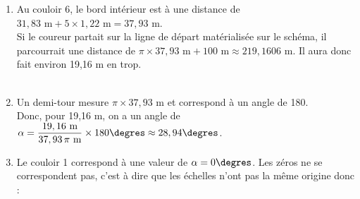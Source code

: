 \begin{enumerate}
\begin{enumerate}
      \item Au couloir 6, le bord intérieur est à une distance de $31,83\text{ m}+5\times1,22\text{ m} =37,93\text{ m}$. \\
      Si le coureur partait sur la ligne de départ matérialisée sur le schéma, il parcourrait une distance de $\pi\times37,93\text{ m}+100\text{ m} \approx219,1606\text{ m}$. Il aura donc fait environ 19,16 m en trop. \\ [1mm]
       \\
      \item Un demi-tour mesure $\pi\times37,93\text{ m}$ et correspond à un angle de 180\degres. \\ [1mm]
      Donc, pour 19,16 m, on a un angle de $\alpha =\dfrac{19,16\text{ m}}{37,93\,\pi\text{ m}}\times180\degres \approx28,94\degres$. \\ [1mm]
      \item Le couloir 1 correspond à une valeur de $\alpha =0\degres$. Les \og zéros \fg{} ne se correspondent pas, c'est à dire que les échelles n'ont pas la même origine donc : \\
   \end{enumerate}
\end{enumerate}
